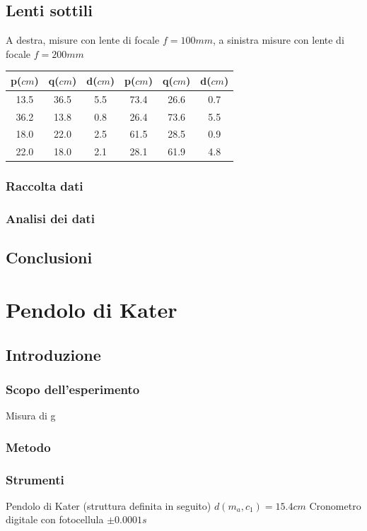 \documentclass[a4paper,10pt]{report}
\begin{document}
\section{Lenti sottili}
A destra, misure con lente di focale $f=100 mm$, a sinistra misure con lente di focale $f=200mm$ 
\\
\begin{center}
\begin{tabular}{c|c|c||c|c|c}
p($cm$) &q($cm$)&d($cm$) &p($cm$) &q($cm$)&d($cm$)\\
\midrule
13.5 & 36.5 & 5.5 & 73.4 & 26.6 & 0.7\\
36.2 & 13.8 & 0.8 & 26.4 & 73.6 & 5.5\\
\midrule
18.0 & 22.0 & 2.5 & 61.5 & 28.5 & 0.9\\
22.0 & 18.0 & 2.1 & 28.1 & 61.9 & 4.8\\
\end{tabular}
\end{center}
\subsection{Raccolta dati}
\subsection{Analisi dei dati}

\section{Conclusioni}

\chapter{Pendolo di Kater}
\section{Introduzione}
\subsection{Scopo dell'esperimento}
Misura di g
\subsection{Metodo}
\subsection{Strumenti}
Pendolo di Kater (struttura definita in seguito)
$d(m_a,c_1)=15.4 cm$
Cronometro digitale con fotocellula $\pm 0.0001 s$ 
\end{document}
